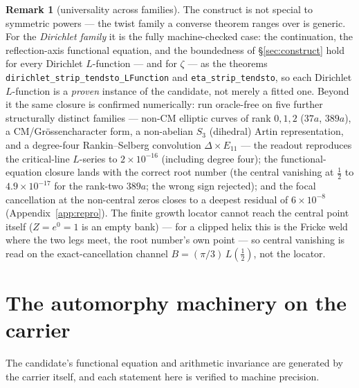 \documentclass[11pt]{article}
\theoremstyle{definition}
\newtheorem{remark}[theorem]{Remark}
\begin{document}
\begin{remark}[universality across families]
The construct is not special to symmetric powers --- the twist family a converse theorem ranges over
is generic. For the \emph{Dirichlet family} it is the fully machine-checked case: the continuation, the
reflection-axis functional equation, and the boundedness of \S\ref{sec:construct} hold for every
Dirichlet $L$-function --- and for $\zeta$ --- as the theorems
\texttt{dirichlet\_strip\_tendsto\_LFunction} and \texttt{eta\_strip\_tendsto}, so each Dirichlet
$L$-function is a \emph{proven} instance of the candidate, not merely a fitted one. Beyond it the same
closure is confirmed numerically: run oracle-free on five further structurally distinct families ---
non-CM elliptic curves of rank $0,1,2$ ($37a$, $389a$), a CM/Gr\"ossencharacter form, a non-abelian
$S_3$ (dihedral) Artin representation, and a degree-four Rankin--Selberg convolution
$\Delta\times E_{11}$ --- the readout reproduces the critical-line $L$-series to $2\times10^{-16}$
(including degree four); the functional-equation closure lands with the correct root number (the
central vanishing at $\tfrac12$ to $4.9\times10^{-17}$ for the rank-two $389a$; the wrong sign rejected);
and the focal cancellation at the non-central zeros closes to a deepest residual of
$6\times10^{-8}$ (Appendix~\ref{app:repro}). The finite growth
locator cannot reach the central point itself ($Z=e^{0}=1$ is an empty bank) --- for a clipped helix
this is the Fricke weld where the two legs meet, the root number's own point --- so central vanishing
is read on the exact-cancellation channel $B=(\pi/3)\,L(\tfrac12)$, not the locator.
\end{remark}

\section{The automorphy machinery on the carrier}\label{sec:machinery}

The candidate's functional equation and arithmetic invariance are generated by the carrier itself, and
each statement here is verified to machine precision.
\end{document}

